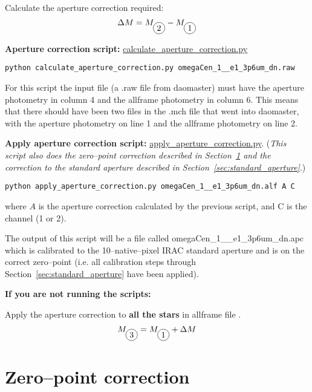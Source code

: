\documentclass[11pt]{article}
\newcommand*\circled[1]{\tikz[baseline=(char.base)]{
            \node[shape=circle,draw,inner sep=2pt] (char) {#1};}}
\begin{document}
Calculate the aperture correction required:
\begin{equation}
\Delta M = M_{\circled{2}} - M_{\circled{1}}
\end{equation}
\label{eqn:apcor}

{\bf Aperture correction script:} \href{https://github.com/vickyscowcroft/smhash_code/blob/master/calculate_aperture_correction.py}{calculate\_aperture\_correction.py}

\begin{verbatim}
python calculate_aperture_correction.py omegaCen_1__e1_3p6um_dn.raw 
\end{verbatim}

For this script the input file (a .raw file from daomaster) must have the aperture photometry in column 4 and the allframe photometry in column 6. This means that there should have been two files in the .mch file that went into daomaster, with the aperture photometry on line 1 and the allframe photometry on line 2.


{\bf Apply aperture correction script:} \href{https://github.com/vickyscowcroft/smhash_code/blob/master/apply\_aperture\_correction.py}{apply\_aperture\_correction.py}. ({\it This script also does the zero--point correction described in Section~\ref{sec:zeropoint} and the correction to the standard aperture described in Section~\ref{sec:standard_aperture}}.)

\begin{verbatim}
python apply_aperture_correction.py omegaCen_1__e1_3p6um_dn.alf A C
\end{verbatim}

where $A$ is the aperture correction calculated by the previous script, and C is the channel (1 or 2).

The output of this script will be a file called omegaCen\_1\_\_e1\_3p6um\_dn.apc which is calibrated to the 10--native--pixel IRAC standard aperture and is on the correct zero--point (i.e. all calibration steps through Section~\ref{sec:standard_aperture} have been applied).

{\bf If you are not running the scripts:} 

Apply the aperture correction to \textbf{all the stars} in allframe file \circled{1}.
\begin{equation}
M_{\circled{3}} = M_{\circled{1}} + \Delta M
\end{equation}
\label{eqn:apply_apcor}

\section{Zero--point correction}
\label{sec:zeropoint}
\end{document}
